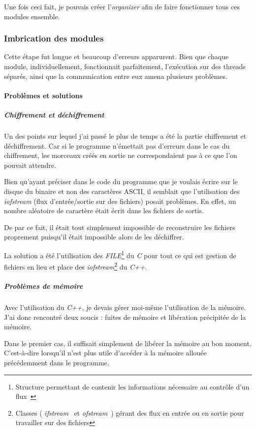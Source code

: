 \documentclass[a4paper,10pt, twoside]{report}
\begin{document}
\begin{spacing}{1.2}
Une fois ceci fait, je pouvais créer l'\textit{organizer} afin de faire
fonctionner tous ces modules ensemble.

\subsubsection{Imbrication des modules}
Cette étape fut longue et beaucoup d'erreurs apparurent. Bien que chaque
module, individuellement, fonctionnait parfaitement, l'exécution sur des 
threads séparés, ainsi que la communication entre eux amena plusieurs
problèmes.

\paragraph{Problèmes et solutions}

\subparagraph{Chiffrement et déchiffrement\\}
Un des points sur lequel j'ai passé le plus de temps a été la partie
chiffrement et déchiffrement. Car si le programme n'émettait pas d'erreurs
dans le cas du chiffrement, les morceaux créés en sortie ne correspondaient
pas à ce que l'on pouvait attendre.

Bien qu'ayant préciser dans le code du programme que je voulais écrire
sur le disque du binaire et non des caractères ASCII, il semblait que
l'utilisation des \textit{iofstream} (flux d'entrée/sortie sur des fichiers)
posait problèmes. En effet, un nombre aléatoire de caractère était
écrit dans les fichiers de sortis. 

De par ce fait, il était tout simplement impossible de reconstruire les
fichiers proprement puisqu'il était impossible alors de les déchiffrer.

La solution a été l'utilisation des \textit{FILE}\footnote{Structure
permettant de contenir les informations nécessaire au contrôle d'un
flux~\cite{refFILE}} du \textit{C} pour tout ce qui est gestion de fichiers en
lieu et place des \textit{iofstream}\footnote{Classes (
\textit{ifstream}~\cite{refIFS} et \textit{ofstream}~\cite{refOFS}) gérant
des flux en entrée ou en sortie pour travailler sur des fichiers} du
\textit{C++}.

\subparagraph{Problèmes de mémoire\\}
Avec l'utilisation du \textit{C++}, je devais gérer moi-même l'utilisation
de la mémoire. J'ai donc rencontré deux soucis : fuites de mémoire et
libération précipitée de la mémoire.

Dans le premier cas, il suffisait simplement de libérer la mémoire au bon
moment. C'est-à-dire lorsqu'il n'est plus utile d'accéder à la mémoire
allouée précédemment dans le programme.


\end{spacing}
\end{document}
